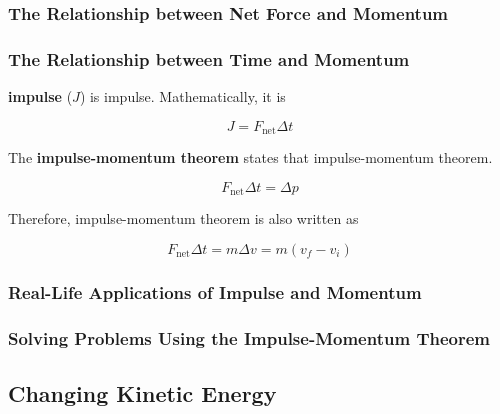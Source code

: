 \documentclass[dvipsnames]{article}
\begin{document}
\subsubsection{The Relationship between Net Force and Momentum}

\subsubsection{The Relationship between Time and Momentum}

\textbf{\Gls{impulse}} ($J$) is \glsdesc{impulse}. Mathematically, it is 

\begin{equation*}
    J = F_\text{net} \Delta t
\end{equation*}

The \textbf{\gls{impulse-momentum theorem}} states that \glsdesc{impulse-momentum theorem}.

\begin{equation*}
    F_\text{net} \Delta t = \Delta p
\end{equation*}

Therefore, impulse-momentum theorem is also written as

\begin{equation*}
    F_\text{net} \Delta t = m \Delta v = m(v_f - v_i)
\end{equation*}




\subsubsection{Real-Life Applications of Impulse and Momentum}

\subsubsection{Solving Problems Using the Impulse-Momentum Theorem}

\subsection{Changing Kinetic Energy}

\begin{center}
\end{center}
\end{document}
